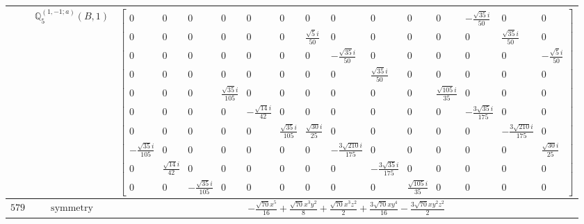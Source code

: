 \documentclass[fleqn,8pt,landscape]{jsarticle}
\begin{document}
\begin{longtable}{ccc}
$  $ & $ \mathbb{Q}_{5}^{(1,-1;a)}(B,1) $ & $ \begin{bmatrix} 0 & 0 & 0 & 0 & 0 & 0 & 0 & 0 & 0 & 0 & 0 & - \frac{\sqrt{35} i}{50} & 0 & 0 \\ 0 & 0 & 0 & 0 & 0 & 0 & \frac{\sqrt{5} i}{50} & 0 & 0 & 0 & 0 & 0 & \frac{\sqrt{35} i}{50} & 0 \\ 0 & 0 & 0 & 0 & 0 & 0 & 0 & - \frac{\sqrt{35} i}{50} & 0 & 0 & 0 & 0 & 0 & - \frac{\sqrt{5} i}{50} \\ 0 & 0 & 0 & 0 & 0 & 0 & 0 & 0 & \frac{\sqrt{35} i}{50} & 0 & 0 & 0 & 0 & 0 \\ 0 & 0 & 0 & \frac{\sqrt{35} i}{105} & 0 & 0 & 0 & 0 & 0 & 0 & \frac{\sqrt{105} i}{35} & 0 & 0 & 0 \\ 0 & 0 & 0 & 0 & - \frac{\sqrt{14} i}{42} & 0 & 0 & 0 & 0 & 0 & 0 & - \frac{3 \sqrt{35} i}{175} & 0 & 0 \\ 0 & 0 & 0 & 0 & 0 & \frac{\sqrt{35} i}{105} & \frac{\sqrt{30} i}{25} & 0 & 0 & 0 & 0 & 0 & - \frac{3 \sqrt{210} i}{175} & 0 \\ - \frac{\sqrt{35} i}{105} & 0 & 0 & 0 & 0 & 0 & 0 & - \frac{3 \sqrt{210} i}{175} & 0 & 0 & 0 & 0 & 0 & \frac{\sqrt{30} i}{25} \\ 0 & \frac{\sqrt{14} i}{42} & 0 & 0 & 0 & 0 & 0 & 0 & - \frac{3 \sqrt{35} i}{175} & 0 & 0 & 0 & 0 & 0 \\ 0 & 0 & - \frac{\sqrt{35} i}{105} & 0 & 0 & 0 & 0 & 0 & 0 & \frac{\sqrt{105} i}{35} & 0 & 0 & 0 & 0 \end{bmatrix} $ \\ \hline
$ 579 $ & $ \text{symmetry} $ & $ - \frac{\sqrt{70} x^{5}}{16} + \frac{\sqrt{70} x^{3} y^{2}}{8} + \frac{\sqrt{70} x^{3} z^{2}}{2} + \frac{3 \sqrt{70} x y^{4}}{16} - \frac{3 \sqrt{70} x y^{2} z^{2}}{2} $ \\

\end{longtable}
\end{document}
